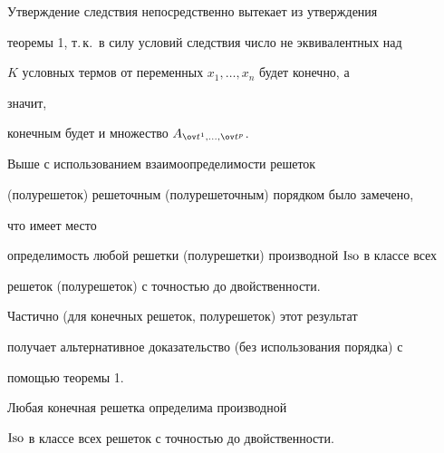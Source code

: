  


Утверждение следствия непосредственно вытекает из утверждения 


теоремы 1, т.\,к.\ в силу условий следствия число не эквивалентных над 


$K$ условных термов от переменных $x_1,\dotsc,x_n$ будет конечно, а 


значит, 


конечным будет и множество $A_{\ov t^1,\dotsc,\ov t^p}$. 


 


Выше с использованием взаимоопределимости решеток 


(полурешеток) решеточным (полурешеточным) порядком было замечено,


что имеет место 


определимость любой решетки (полурешетки) производной $\operatorname{Iso}$ в классе всех 


решеток (полурешеток) с точностью до двойственности. 


 


Частично (для конечных решеток, полурешеток) этот результат


получает альтернативное доказательство (без использования порядка) с 


помощью теоремы 1. 


 


\begin{cor} 


Любая конечная решетка определима производной 


$\operatorname{Iso}$ в классе всех решеток с точностью до двойственности. 


\end{cor} 


 


